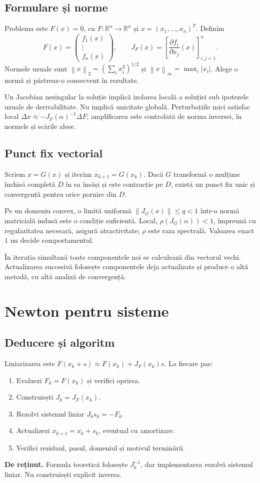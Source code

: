 \documentclass[11pt,a4paper]{article}
\newcommand{\R}{\mathbb R}
\newcommand{\norm}[1]{\left\lVert#1\right\rVert}
\newcommand{\important}[1]{\par\smallskip\textbf{De reținut.} #1\par\smallskip}
\begin{document}
\subsection{Formulare și norme}
Problema este $F(x)=0$, cu $F:\R^n\to\R^n$ și $x=(x_1,\ldots,x_n)^T$. Definim
\[
F(x)=\begin{pmatrix}f_1(x)\\\vdots\\f_n(x)\end{pmatrix},\qquad
J_F(x)=\left[\frac{\partial f_i}{\partial x_j}(x)\right]_{i,j=1}^n.
\]
Normele uzuale sunt $\norm{x}_2=(\sum_i x_i^2)^{1/2}$ și $\norm{x}_\infty=\max_i|x_i|$. Alege o normă și păstreaz-o consecvent în rezultate.

Un Jacobian nesingular la soluție implică izolarea locală a soluției sub ipotezele uzuale de derivabilitate. Nu implică unicitate globală. Perturbațiile mici satisfac local $\Delta x\approx-J_F(\alpha)^{-1}\Delta F$; amplificarea este controlată de norma inversei, în normele și scările alese.

\subsection{Punct fix vectorial}
Scriem $x=G(x)$ și iterăm $x_{k+1}=G(x_k)$. Dacă $G$ transformă o mulțime închisă completă $D$ în ea însăși și este contracție pe $D$, există un punct fix unic și convergență pentru orice pornire din $D$.

Pe un domeniu convex, o limită uniformă $\norm{J_G(x)}\le q<1$ într-o normă matricială indusă este o condiție suficientă. Local, $\rho(J_G(\alpha))<1$, împreună cu regularitatea necesară, asigură atractivitate; $\rho$ este raza spectrală. Valoarea exact $1$ nu decide comportamentul.

În iterația simultană toate componentele noi se calculează din vectorul vechi. Actualizarea succesivă folosește componentele deja actualizate și produce o altă metodă, cu altă analiză de convergență.

\section{Newton pentru sisteme}
\subsection{Deducere și algoritm}
Liniarizarea este $F(x_k+s)\approx F(x_k)+J_F(x_k)s$. La fiecare pas:
\begin{enumerate}
\item Evaluezi $F_k=F(x_k)$ și verifici oprirea.
\item Construiești $J_k=J_F(x_k)$.
\item Rezolvi sistemul liniar $J_k s_k=-F_k$.
\item Actualizezi $x_{k+1}=x_k+s_k$, eventual cu amortizare.
\item Verifici reziduul, pasul, domeniul și motivul terminării.
\end{enumerate}
\important{Formula teoretică folosește $J_k^{-1}$, dar implementarea rezolvă sistemul liniar. Nu construiești explicit inversa.}
\end{document}
